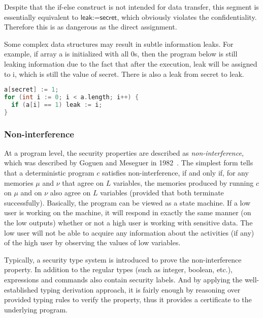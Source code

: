 Despite that the \textsf{if-else} construct is not intended for data transfer, this segment is essentially equivalent to $\textsf{leak:=secret}$, which obviously violates the confidentiality. Therefore this is as dangerous as the direct assignment.

Some complex data structures may result in subtle information leaks. For example, if array \textsf{a} is initialized with all \textsf{0}s, then the program below is still leaking information due to the fact that after the execution, \textsf{leak} will be assigned to \textsf{i}, which is still the value of \textsf{secret}. There is also a leak from \textsf{secret} to \textsf{leak}.

\begin{lstlisting}[language=c,float=h]
a[secret] := 1;
for (int i := 0; i < a.length; i++) {
  if (a[i] == 1) leak := i;
}
\end{lstlisting}

\subsubsection{Non-interference}
At a program level, the security properties are described as \emph{non-interference}, which was described by Goguen and Meseguer in 1982~\cite{Goguen:1982ta}. The simplest form tells that a deterministic program $c$ satisfies non-interference, if and only if, for any memories $\mu$ and $\nu$ that agree on $L$ variables, the memories produced by running $c$ on $\mu$ and on $\nu$ also agree on $L$ variables (provided that both terminate successfully). Basically, the program can be viewed as a state machine. If a low user is working on the machine, it will respond in exactly the same manner (on the low outputs) whether or not a high user is working with sensitive data. The low user will not be able to acquire any information about the activities (if any) of the high user by observing the values of low variables.

Typically, a security type system is introduced to prove the non-interference property. In addition to the regular types (such as integer, boolean, etc.), expressions and commands also contain security labels. And by applying the well-established typing derivation approach, it is fairly enough by reasoning over provided typing rules to verify the property, thus it provides a certificate to the underlying program.



